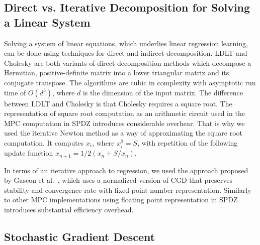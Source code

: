 \documentclass{article}
\begin{document}
\subsection{Direct vs. Iterative Decomposition for Solving a Linear System}

Solving a system of linear equations, which underlies linear regression learning, can be done using techniques for direct and indirect decomposition.
LDLT and Cholesky are both variants of direct decomposition methods which decompose a Hermitian, positive-definite matrix into a lower triangular matrix and its conjugate transpose. The algorithms are cubic in complexity with asymptotic run time of $O(d^3)$, where $d$ is the dimension of the input matrix. 
The difference between LDLT and Cholesky is that Cholesky requires a square root. The representation of square root computation as an arithmetic circuit used in the MPC computation in SPDZ introduces 
considerable overhear. That is why we used the iterative Newton method as a way of approximating the square root computation. It computes $x_i$, where $x_{i}^2 = S$, with repetition of the following
update function $x_{n+1} =1/2 (x_{n} + S/x_{n})$.

In terms of an iterative approach to regression, we used the approach proposed by
Gascon et al.~\cite{GSB0DZE17}, which uses a normalized version of CGD that preserves stability and convergence rate with fixed-point number representation. Similarly to other MPC implementations
using floating point representation in SPDZ introduces substantial efficiency overhead. 


\subsection{Stochastic Gradient Descent}
\end{document}
